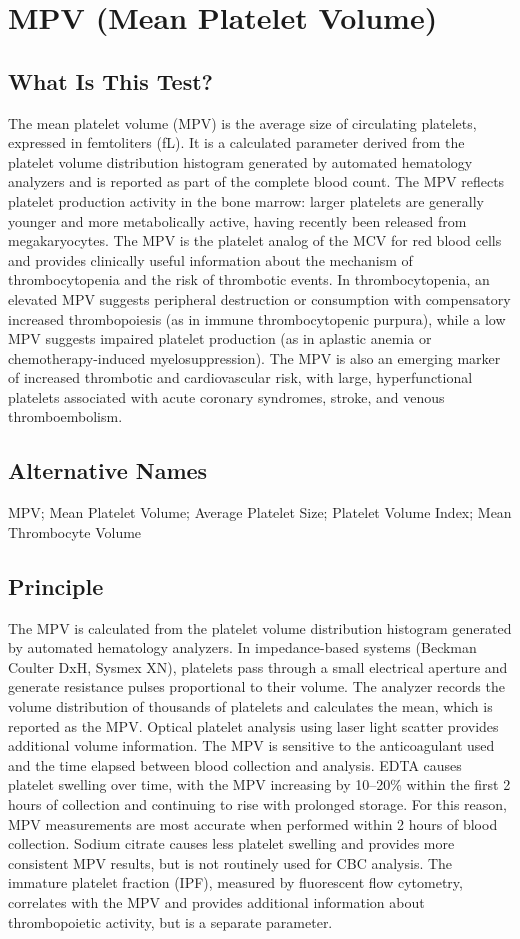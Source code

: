 \chapter{MPV (Mean Platelet Volume)}

\section*{What Is This Test?}
The mean platelet volume (MPV) is the average size of circulating platelets, expressed in femtoliters (fL). It is a calculated parameter derived from the platelet volume distribution histogram generated by automated hematology analyzers and is reported as part of the complete blood count. The MPV reflects platelet production activity in the bone marrow: larger platelets are generally younger and more metabolically active, having recently been released from megakaryocytes. The MPV is the platelet analog of the MCV for red blood cells and provides clinically useful information about the mechanism of thrombocytopenia and the risk of thrombotic events. In thrombocytopenia, an elevated MPV suggests peripheral destruction or consumption with compensatory increased thrombopoiesis (as in immune thrombocytopenic purpura), while a low MPV suggests impaired platelet production (as in aplastic anemia or chemotherapy-induced myelosuppression). The MPV is also an emerging marker of increased thrombotic and cardiovascular risk, with large, hyperfunctional platelets associated with acute coronary syndromes, stroke, and venous thromboembolism.

\section*{Alternative Names}
MPV; Mean Platelet Volume; Average Platelet Size; Platelet Volume Index; Mean Thrombocyte Volume

\section*{Principle}
The MPV is calculated from the platelet volume distribution histogram generated by automated hematology analyzers. In impedance-based systems (Beckman Coulter DxH, Sysmex XN), platelets pass through a small electrical aperture and generate resistance pulses proportional to their volume. The analyzer records the volume distribution of thousands of platelets and calculates the mean, which is reported as the MPV. Optical platelet analysis using laser light scatter provides additional volume information. The MPV is sensitive to the anticoagulant used and the time elapsed between blood collection and analysis. EDTA causes platelet swelling over time, with the MPV increasing by 10--20\% within the first 2 hours of collection and continuing to rise with prolonged storage. For this reason, MPV measurements are most accurate when performed within 2 hours of blood collection. Sodium citrate causes less platelet swelling and provides more consistent MPV results, but is not routinely used for CBC analysis. The immature platelet fraction (IPF), measured by fluorescent flow cytometry, correlates with the MPV and provides additional information about thrombopoietic activity, but is a separate parameter.

